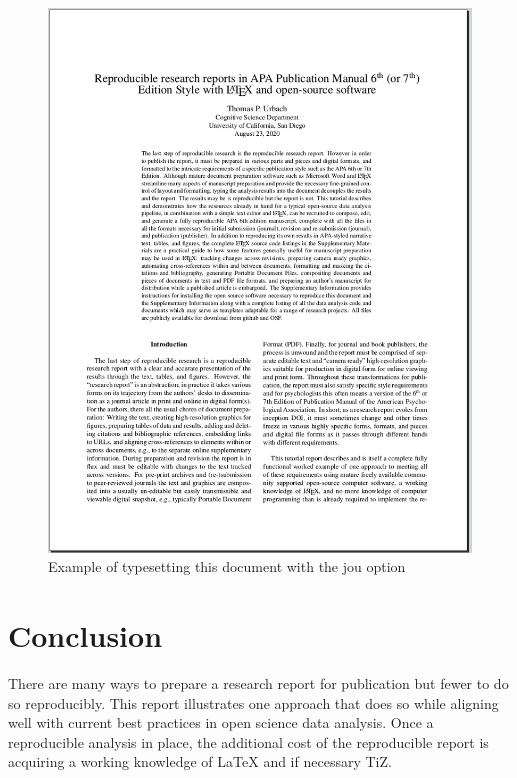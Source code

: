 \documentclass[helv,10pt,man,floatsintext]{apa6}  %
\begin{document}
\begin{figure}
\caption{Example of typesetting this document with the jou option}
\centering
\includegraphics[width=.65\textwidth]{images/apa67_jou.png}
\end{figure}


\section{Conclusion}

There are many ways to prepare a research report for publication but
fewer to do so reproducibly. This report illustrates one approach that
does so while aligning well with current best practices in open
science data analysis. Once a reproducible analysis in place, the
additional cost of the reproducible report is acquiring a working
knowledge of \LaTeX{} and if necessary Ti{\it}Z. 

\newpage
\printbibliography
\end{document}

